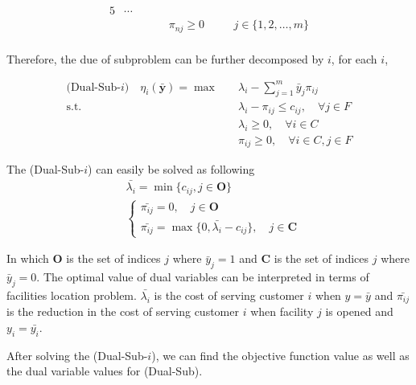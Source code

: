 \begin{alignat*}{5}
                                                     & \cdots\\
                                                     &                                                   &&                                                           && \pi_{nj} \ge 0                                   && \quad j \in \{1, 2, \ldots, m\}\\
                \end{alignat*}

                Therefore, the due of subproblem can be further decomposed by $i$, for each $i$,

                \begin{align*}
                    \text{(Dual-Sub-$i$)} \quad \eta_i(\bar{\mathbf{y}}) = \max \quad & \lambda_i - \sum_{j = 1}^m \bar{y}_j \pi_{ij}\\
                    \text{s.t.} \quad & \lambda_i - \pi_{ij} \le c_{ij}, \quad \forall j \in F\\
                    & \lambda_i \ge 0, \quad \forall i \in C\\
                    & \pi_{ij} \ge 0, \quad \forall i \in C, j \in F
                \end{align*}

                The (Dual-Sub-$i$) can easily be solved as following
                \begin{align*}
                    &\bar{\lambda_i} = \min \{c_{ij}, j \in \mathbf{O}\}\\
                    &\begin{cases}
                        \bar{\pi_{ij}} = 0, \quad j \in \mathbf{O}\\
                        \bar{\pi_{ij}} = \max \{0, \bar{\lambda_i} - c_{ij}\}, \quad j \in \mathbf{C}
                    \end{cases}
                \end{align*}

                In which $\mathbf{O}$ is the set of indices $j$ where $\bar{y}_j = 1$ and $\mathbf{C}$ is the set of indices $j$ where $\bar{y}_j = 0$. The optimal value of dual variables can be interpreted in terms of facilities location problem. $\bar{\lambda_i}$ is the cost of serving customer $i$ when $y = \bar{y}$ and $\bar{\pi_{ij}}$ is the reduction in the cost of serving customer $i$ when facility $j$ is opened and $y_i = \bar{y_i}$.

                After solving the (Dual-Sub-$i$), we can find the objective function value as well as the dual variable values for (Dual-Sub). 

